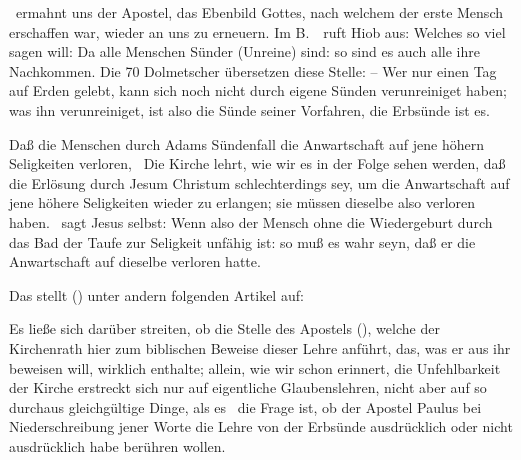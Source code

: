 \begin{aufza}
\item {}\ ermahnt uns der Apostel, das Ebenbild Gottes, nach welchem der erste Mensch erschaffen war, wieder an uns zu erneuern. Im B.~\ ruft Hiob aus:  Welches so viel sagen will: Da alle Menschen Sünder (Unreine) sind: so sind es auch alle ihre Nachkommen. Die 70 Dolmetscher übersetzen diese Stelle:  -- Wer nur einen Tag auf Erden gelebt, kann sich noch nicht durch eigene Sünden verunreiniget haben; was ihn verunreiniget, ist also die Sünde seiner Vorfahren, die Erbsünde ist es.
\item Daß die Menschen durch Adams Sündenfall die Anwartschaft auf jene höhern Seligkeiten verloren, \usw\ Die Kirche lehrt, wie wir es in der Folge sehen werden, daß die Erlösung durch Jesum Christum schlechterdings  sey, um die Anwartschaft auf jene höhere Seligkeiten wieder zu erlangen; sie müssen dieselbe also verloren haben. \ sagt Jesus selbst:  Wenn also der Mensch ohne die Wiedergeburt durch das Bad der Taufe zur Seligkeit unfähig ist: so muß es wahr seyn, daß er die Anwartschaft auf dieselbe verloren hatte.
\item Das  stellt () unter andern folgenden Artikel auf: \par
Es ließe sich darüber streiten, ob die Stelle des Apostels (), welche der Kirchenrath hier zum biblischen Beweise dieser Lehre anführt, das, was er aus ihr beweisen will, wirklich enthalte; allein, wie wir schon erinnert, die Unfehlbarkeit der Kirche erstreckt sich nur auf eigentliche Glaubenslehren, nicht aber auf so durchaus gleichgültige Dinge, als es \zB\ die Frage ist, ob der Apostel Paulus bei Niederschreibung jener Worte die Lehre von der Erbsünde ausdrücklich oder nicht ausdrücklich habe berühren wollen.\par

\end{aufza}

